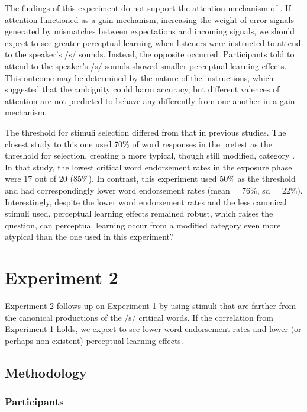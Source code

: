 The findings of this experiment do not support the attention mechanism of \citet{Clark2013}.
If attention functioned as a gain mechanism, increasing the weight of error signals generated by mismatches between expectations and incoming signals, we should expect to see greater perceptual learning when listeners were instructed to attend to the speaker's /s/ sounds.
Instead, the opposite occurred.
Participants told to attend to the speaker's /s/ sounds showed smaller perceptual learning effects.
This outcome may be determined by the nature of the instructions, which suggested that the ambiguity could harm accuracy, but different valences of attention are not predicted to behave any differently from one another in a gain mechanism.

The threshold for stimuli selection differed from that in previous studies. The closest study to this one used 70\% of word responses in the pretest as the threshold for selection, creating a more typical, though still modified, category \citep{Reinisch2013}.  
In that study, the lowest critical word endorsement rates in the exposure phase were 17 out of 20 (85\%).  
In contrast, this experiment used 50\% as the threshold and had correspondingly lower word endorsement rates (mean = 76\%, sd = 22\%).  
Interestingly, despite the lower word endorsement rates and the less canonical stimuli used, perceptual learning effects remained robust, which raises the question, can perceptual learning occur from a modified category even more atypical than the one used in this experiment?

\section{Experiment 2}

Experiment 2 follows up on Experiment 1 by using stimuli that are farther from the canonical productions of the /s/ critical words.  If the correlation from Experiment 1 holds, we expect to see lower word endorsement rates and lower (or perhaps non-existent) perceptual learning effects.

\subsection{Methodology}

\subsubsection{Participants}

